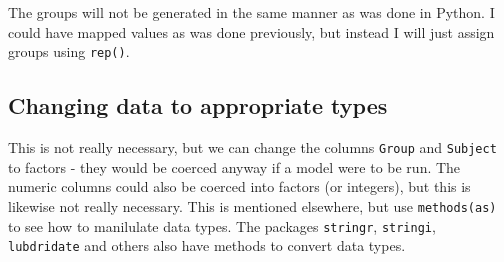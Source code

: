 \documentclass[]{article}
\newenvironment{Shaded}{\begin{snugshade}}{\end{snugshade}}
\newcommand{\KeywordTok}[1]{\textcolor[rgb]{0.13,0.29,0.53}{\textbf{{#1}}}}
\newcommand{\DecValTok}[1]{\textcolor[rgb]{0.00,0.00,0.81}{{#1}}}
\newcommand{\FloatTok}[1]{\textcolor[rgb]{0.00,0.00,0.81}{{#1}}}
\newcommand{\StringTok}[1]{\textcolor[rgb]{0.31,0.60,0.02}{{#1}}}
\newcommand{\NormalTok}[1]{{#1}}
\begin{document}
The groups will not be generated in the same manner as was done in
Python. I could have mapped values as was done previously, but instead I
will just assign groups using \texttt{rep()}.

\begin{Shaded}
\end{Shaded}

\subsection{Changing data to appropriate
types}\label{changing-data-to-appropriate-types}

This is not really necessary, but we can change the columns
\texttt{Group} and \texttt{Subject} to factors - they would be coerced
anyway if a model were to be run. The numeric columns could also be
coerced into factors (or integers), but this is likewise not really
necessary. This is mentioned elsewhere, but use \texttt{methods(as)} to
see how to manilulate data types. The packages \texttt{stringr},
\texttt{stringi}, \texttt{lubdridate} and others also have methods to
convert data types.

\begin{Shaded}
\end{Shaded}
\end{document}

